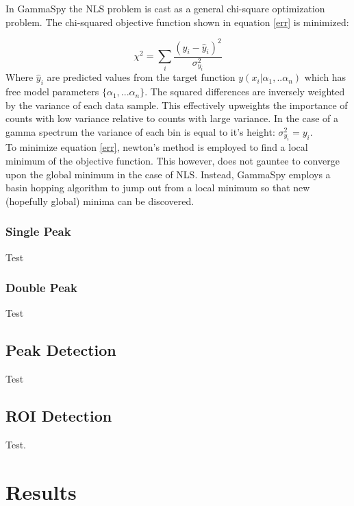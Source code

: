 \documentclass[10pt]{article}
\begin{document}
In GammaSpy the NLS problem is cast as a general chi-square optimization problem.  The chi-squared objective function shown in equation \ref{err} is minimized:

\begin{equation}
    \chi^2 = \sum_i \frac{(y_i - \hat y_i)^2}{\sigma_{y_i}^2}
    \label{err}
\end{equation}
Where $\hat y_i$ are predicted values from the target function $y(x_i|\alpha_1, .. \alpha_n)$ which has free model parameters
$\{\alpha_1, ... \alpha_n\}$.  The squared differences are inversely weighted by the variance of
each data sample.  This effectively upweights the importance of counts with low variance relative to counts with large variance.  In the case
of a gamma spectrum the variance of each bin is equal to it's height: $\sigma_{y_i}^2 = y_i$. \\

To minimize equation \ref{err}, newton's method is employed to find a local minimum of the objective function.  This however, does not
gauntee to converge upon the global minimum in the case of NLS.  Instead, GammaSpy employs a basin hopping algorithm to
jump out from a local minimum so that new (hopefully global) minima can be discovered.

\subsubsection{Single Peak}
Test

\subsubsection{Double Peak}
Test

\subsection{Peak Detection}
Test

\subsection{ROI Detection}

Test.


\section{Results}
\end{document}
